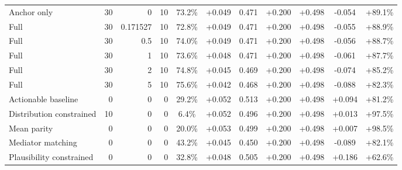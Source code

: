 \begin{table}[htbp]
\begin{tabular}{lrrrccccccc}
Anchor only & 30 & 0 & 10 & 73.2\% & +0.049 & 0.471 & +0.200 & +0.498 & -0.054 & +89.1\% \\
Full & 30 & 0.171527 & 10 & 72.8\% & +0.049 & 0.471 & +0.200 & +0.498 & -0.055 & +88.9\% \\
Full & 30 & 0.5 & 10 & 74.0\% & +0.049 & 0.471 & +0.200 & +0.498 & -0.056 & +88.7\% \\
Full & 30 & 1 & 10 & 73.6\% & +0.048 & 0.471 & +0.200 & +0.498 & -0.061 & +87.7\% \\
Full & 30 & 2 & 10 & 74.8\% & +0.045 & 0.469 & +0.200 & +0.498 & -0.074 & +85.2\% \\
Full & 30 & 5 & 10 & 75.6\% & +0.042 & 0.468 & +0.200 & +0.498 & -0.088 & +82.3\% \\
Actionable baseline & 0 & 0 & 0 & 29.2\% & +0.052 & 0.513 & +0.200 & +0.498 & +0.094 & +81.2\% \\
Distribution constrained & 10 & 0 & 0 & 6.4\% & +0.052 & 0.496 & +0.200 & +0.498 & +0.013 & +97.5\% \\
Mean parity & 0 & 0 & 0 & 20.0\% & +0.053 & 0.499 & +0.200 & +0.498 & +0.007 & +98.5\% \\
Mediator matching & 0 & 0 & 0 & 43.2\% & +0.045 & 0.450 & +0.200 & +0.498 & -0.089 & +82.1\% \\
Plausibility constrained & 0 & 0 & 0 & 32.8\% & +0.048 & 0.505 & +0.200 & +0.498 & +0.186 & +62.6\% \\
\bottomrule
\end{tabular}
\end{table}